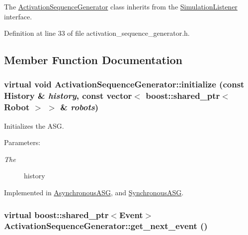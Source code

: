 The \hyperlink{class_activation_sequence_generator}{ActivationSequenceGenerator} class inherits from the \hyperlink{class_simulation_listener}{SimulationListener} interface. 

Definition at line 33 of file activation\_\-sequence\_\-generator.h.

\subsection{Member Function Documentation}
\hypertarget{class_activation_sequence_generator_01592eb2b4293512d2ad00dc4adf0361}{
\subsubsection[initialize]{\setlength{\rightskip}{0pt plus 5cm}virtual void ActivationSequenceGenerator::initialize (const {\bf History} \& {\em history}, \/  const vector$<$ boost::shared\_\-ptr$<$ Robot $>$ $>$ \& {\em robots})}}
\label{class_activation_sequence_generator_01592eb2b4293512d2ad00dc4adf0361}


Initializes the ASG. \begin{Desc}
\item[Parameters:]
\begin{description}
\item[{\em The}]history \end{description}
\end{Desc}


Implemented in \hyperlink{class_asynchronous_a_s_g_6ef9907d9f0043e45cc08a3e0d5178fa}{AsynchronousASG}, and \hyperlink{class_synchronous_a_s_g_05acba7c914bdb8b4080ef763c092993}{SynchronousASG}.\hypertarget{class_activation_sequence_generator_cf20a8caaee580655c57b8843d82d5f5}{
\subsubsection[get\_\-next\_\-event]{\setlength{\rightskip}{0pt plus 5cm}virtual boost::shared\_\-ptr$<$Event$>$ ActivationSequenceGenerator::get\_\-next\_\-event ()}}
\label{class_activation_sequence_generator_cf20a8caaee580655c57b8843d82d5f5}


